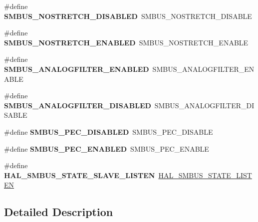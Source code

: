 \begin{DoxyCompactItemize}
\#define {\bfseries S\+M\+B\+U\+S\+\_\+\+N\+O\+S\+T\+R\+E\+T\+C\+H\+\_\+\+D\+I\+S\+A\+B\+L\+ED}~S\+M\+B\+U\+S\+\_\+\+N\+O\+S\+T\+R\+E\+T\+C\+H\+\_\+\+D\+I\+S\+A\+B\+LE
\item 
\mbox{\label{group___h_a_l___s_m_b_u_s___aliased___defines_gac13cdfb033be4b09e90f8d65745d48c2}} 
\#define {\bfseries S\+M\+B\+U\+S\+\_\+\+N\+O\+S\+T\+R\+E\+T\+C\+H\+\_\+\+E\+N\+A\+B\+L\+ED}~S\+M\+B\+U\+S\+\_\+\+N\+O\+S\+T\+R\+E\+T\+C\+H\+\_\+\+E\+N\+A\+B\+LE
\item 
\mbox{\label{group___h_a_l___s_m_b_u_s___aliased___defines_gaf636bd945246ff29d4e35ee3be6f1f6d}} 
\#define {\bfseries S\+M\+B\+U\+S\+\_\+\+A\+N\+A\+L\+O\+G\+F\+I\+L\+T\+E\+R\+\_\+\+E\+N\+A\+B\+L\+ED}~S\+M\+B\+U\+S\+\_\+\+A\+N\+A\+L\+O\+G\+F\+I\+L\+T\+E\+R\+\_\+\+E\+N\+A\+B\+LE
\item 
\mbox{\label{group___h_a_l___s_m_b_u_s___aliased___defines_ga2af661132b3a2cd8c964dc2104f8223d}} 
\#define {\bfseries S\+M\+B\+U\+S\+\_\+\+A\+N\+A\+L\+O\+G\+F\+I\+L\+T\+E\+R\+\_\+\+D\+I\+S\+A\+B\+L\+ED}~S\+M\+B\+U\+S\+\_\+\+A\+N\+A\+L\+O\+G\+F\+I\+L\+T\+E\+R\+\_\+\+D\+I\+S\+A\+B\+LE
\item 
\mbox{\label{group___h_a_l___s_m_b_u_s___aliased___defines_ga8f509e1a8b4bbcd2f687f066e8dafffb}} 
\#define {\bfseries S\+M\+B\+U\+S\+\_\+\+P\+E\+C\+\_\+\+D\+I\+S\+A\+B\+L\+ED}~S\+M\+B\+U\+S\+\_\+\+P\+E\+C\+\_\+\+D\+I\+S\+A\+B\+LE
\item 
\mbox{\label{group___h_a_l___s_m_b_u_s___aliased___defines_ga446c885b16518a909013c12085584e21}} 
\#define {\bfseries S\+M\+B\+U\+S\+\_\+\+P\+E\+C\+\_\+\+E\+N\+A\+B\+L\+ED}~S\+M\+B\+U\+S\+\_\+\+P\+E\+C\+\_\+\+E\+N\+A\+B\+LE
\item 
\mbox{\label{group___h_a_l___s_m_b_u_s___aliased___defines_ga76b21c836a3097828fdb6635777414ae}} 
\#define {\bfseries H\+A\+L\+\_\+\+S\+M\+B\+U\+S\+\_\+\+S\+T\+A\+T\+E\+\_\+\+S\+L\+A\+V\+E\+\_\+\+L\+I\+S\+T\+EN}~\hyperlink{group___h_a_l__state__definition_gad20bc91031bbc73a2ac7221ee8514305}{H\+A\+L\+\_\+\+S\+M\+B\+U\+S\+\_\+\+S\+T\+A\+T\+E\+\_\+\+L\+I\+S\+T\+EN}
\end{DoxyCompactItemize}


\subsection{Detailed Description}
